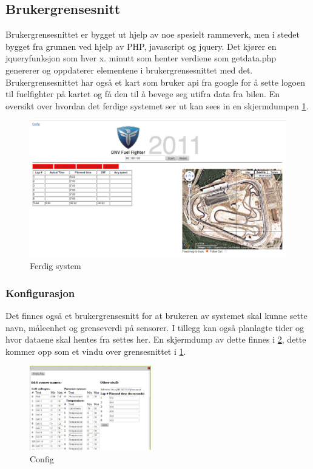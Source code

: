 \subsection{Brukergrensesnitt}
Brukergrensesnittet er bygget ut hjelp av noe spesielt rammeverk, men i stedet bygget fra grunnen ved hjelp av PHP, javascript og jquery. Det kjører en jqueryfunksjon som hver x. minutt som henter verdiene som getdata.php genererer og oppdaterer elementene i brukergrensesnittet med det. Brukergrensesnittet har også et kart som bruker api fra google for å sette logoen til fuelfighter på kartet og få den til å bevege seg utifra data fra bilen. En oversikt over hvordan det ferdige systemet ser ut kan sees in en skjermdumpen \ref{gui}.
\begin{figure}[H]
\caption{Ferdig system} 
\label{gui}
\includegraphics[width=\textwidth]{images/gui.png}
\end{figure}
\subsubsection{Konfigurasjon}
Det finnes også et brukergrensesnitt for at brukeren av systemet skal kunne sette navn, måleenhet og grenseverdi på sensorer. I tillegg kan også planlagte tider og hvor dataene skal hentes fra settes her.
En skjermdump av dette finnes i \ref{config}, dette kommer opp som et vindu over grensesnittet i \ref{gui}.
\begin{figure}[H]
\caption{Config} 
\label{config}
\includegraphics[width=200px]{images/config.png}
\end{figure}

